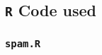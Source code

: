 \documentclass[11pt]{article}\usepackage[]{graphicx}\usepackage[]{color}
\begin{document}
\begin{appendices}
  \subsection{\texttt{R} Code used}\label{Rcode}
  \subsubsection{\texttt{spam.R}}
        
              
                              
  
                              
	
\end{appendices}
\end{document}
